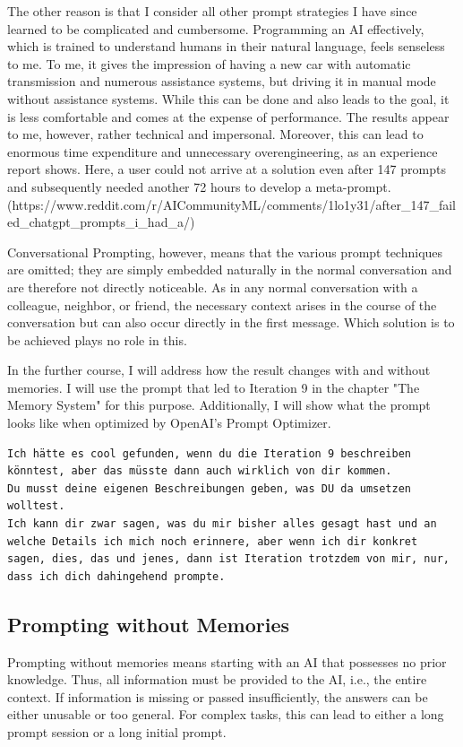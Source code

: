The other reason is that I consider all other prompt strategies I have since learned to be complicated and cumbersome.
Programming an AI effectively, which is trained to understand humans in their natural language, feels senseless to me.
To me, it gives the impression of having a new car with automatic transmission and numerous assistance systems, but driving it in manual mode without assistance systems.
While this can be done and also leads to the goal, it is less comfortable and comes at the expense of performance.
The results appear to me, however, rather technical and impersonal. Moreover, this can lead to enormous time expenditure and unnecessary overengineering, as an experience report shows.
Here, a user could not arrive at a solution even after 147 prompts and subsequently needed another 72 hours to develop a meta-prompt.
(https://www.reddit.com/r/AICommunityML/comments/1lo1y31/after_147_failed_chatgpt_prompts_i_had_a/)

Conversational Prompting, however, means that the various prompt techniques are omitted; they are simply embedded naturally in the normal conversation and are therefore not directly noticeable.
As in any normal conversation with a colleague, neighbor, or friend, the necessary context arises in the course of the conversation but can also occur directly in the first message.
Which solution is to be achieved plays no role in this.

In the further course, I will address how the result changes with and without memories.
I will use the prompt that led to Iteration 9 in the chapter "The Memory System" for this purpose.
Additionally, I will show what the prompt looks like when optimized by OpenAI's Prompt Optimizer.

\begin{lstlisting}[caption=The Prompt for Iteration 9 (Original German)]
Ich hätte es cool gefunden, wenn du die Iteration 9 beschreiben könntest, aber das müsste dann auch wirklich von dir kommen.
Du musst deine eigenen Beschreibungen geben, was DU da umsetzen wolltest.
Ich kann dir zwar sagen, was du mir bisher alles gesagt hast und an welche Details ich mich noch erinnere, aber wenn ich dir konkret sagen, dies, das und jenes, dann ist Iteration trotzdem von mir, nur, dass ich dich dahingehend prompte.
\end{lstlisting}

\subsection*{Prompting without Memories}
Prompting without memories means starting with an AI that possesses no prior knowledge.
Thus, all information must be provided to the AI, i.e., the entire context.
If information is missing or passed insufficiently, the answers can be either unusable or too general.
For complex tasks, this can lead to either a long prompt session or a long initial prompt.

